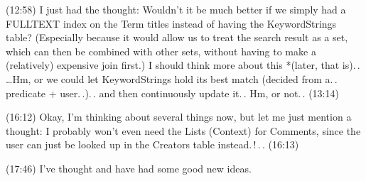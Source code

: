 \documentclass{report}
\begin{document}
(12:58) I just had the thought: Wouldn't it be much better if we simply had a FULLTEXT index on the Term titles instead of having the KeywordStrings table? (Especially because it would allow us to treat the search result as a set, which can then be combined with other sets, without having to make a (relatively) expensive join first.) I should think more about this *(later, that is).\,. 
\ldots Hm, or we could let KeywordStrings hold its best match (decided from a.\,. predicate + user.\,.).\,. and then continuously update it.\,. Hm, or not.\,. (13:14)

(16:12) Okay, I'm thinking about several things now, but let me just mention a thought: I probably won't even need the Lists (Context) for Comments, since the user can just be looked up in the Creators table instead.\,!\,.\,. (16:13)

(17:46) I've thought and have had some good new ideas. %

\end{document}
